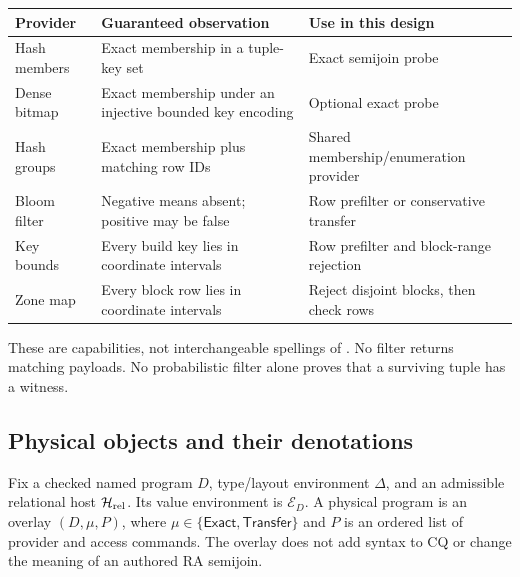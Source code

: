 \begin{center}\small
\begin{tabular}{p{.19\linewidth}p{.35\linewidth}p{.37\linewidth}}
\toprule
Provider & Guaranteed observation & Use in this design\\
\midrule
Hash members & Exact membership in a tuple-key set & Exact semijoin probe\\
Dense bitmap & Exact membership under an injective bounded key encoding & Optional exact probe\\
Hash groups & Exact membership plus matching row IDs & Shared membership/enumeration provider\\
Bloom filter & Negative means absent; positive may be false & Row prefilter or conservative transfer\\
Key bounds & Every build key lies in coordinate intervals & Row prefilter and block-range rejection\\
Zone map & Every block row lies in coordinate intervals & Reject disjoint blocks, then check rows\\
\bottomrule
\end{tabular}
\end{center}
These are capabilities, not interchangeable spellings of .
No filter returns matching payloads. No probabilistic filter alone proves
that a surviving tuple has a witness.

\subsection{Physical objects and their denotations}
\label{sec:ya-objects}
Fix a checked named program $D$, type/layout environment $\Delta$, and an
admissible relational host $\mathcal H_{\rm rel}$. Its value environment is
$\mathcal E_D$. A physical program is an overlay $(D,\mu,P)$, where
$\mu\in\{\mathsf{Exact},\mathsf{Transfer}\}$ and $P$ is an ordered list of
provider and access commands. The overlay does not add syntax to CQ or change
the meaning of an authored RA semijoin.

